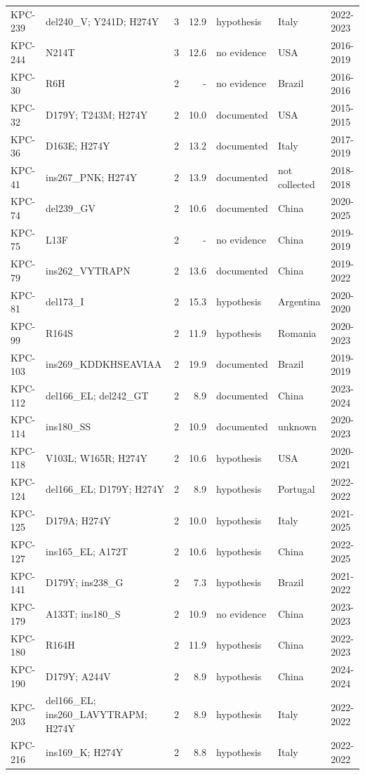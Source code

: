 \begin{longtable}{@{}l p{4.6cm} r r l l l@{}}
KPC-239 & del240\_V; Y241D; H274Y & 3 & 12.9 & hypothesis & Italy & 2022-2023 \\
KPC-244 & N214T & 3 & 12.6 & no evidence & USA & 2016-2019 \\
KPC-30 & R6H & 2 & - & no evidence & Brazil & 2016-2016 \\
KPC-32 & D179Y; T243M; H274Y & 2 & 10.0 & documented & USA & 2015-2015 \\
KPC-36 & D163E; H274Y & 2 & 13.2 & documented & Italy & 2017-2019 \\
KPC-41 & ins267\_PNK; H274Y & 2 & 13.9 & documented & not collected & 2018-2018 \\
KPC-74 & del239\_GV & 2 & 10.6 & documented & China & 2020-2025 \\
KPC-75 & L13F & 2 & - & no evidence & China & 2019-2019 \\
KPC-79 & ins262\_VYTRAPN & 2 & 13.6 & documented & China & 2019-2022 \\
KPC-81 & del173\_I & 2 & 15.3 & hypothesis & Argentina & 2020-2020 \\
KPC-99 & R164S & 2 & 11.9 & hypothesis & Romania & 2020-2023 \\
KPC-103 & ins269\_KDDKHSEAVIAA & 2 & 19.9 & documented & Brazil & 2019-2019 \\
KPC-112 & del166\_EL; del242\_GT & 2 & 8.9 & documented & China & 2023-2024 \\
KPC-114 & ins180\_SS & 2 & 10.9 & documented & unknown & 2020-2023 \\
KPC-118 & V103L; W165R; H274Y & 2 & 10.6 & hypothesis & USA & 2020-2021 \\
KPC-124 & del166\_EL; D179Y; H274Y & 2 & 8.9 & hypothesis & Portugal & 2022-2022 \\
KPC-125 & D179A; H274Y & 2 & 10.0 & hypothesis & Italy & 2021-2025 \\
KPC-127 & ins165\_EL; A172T & 2 & 10.6 & hypothesis & China & 2022-2025 \\
KPC-141 & D179Y; ins238\_G & 2 & 7.3 & hypothesis & Brazil & 2021-2022 \\
KPC-179 & A133T; ins180\_S & 2 & 10.9 & no evidence & China & 2023-2023 \\
KPC-180 & R164H & 2 & 11.9 & hypothesis & China & 2022-2023 \\
KPC-190 & D179Y; A244V & 2 & 8.9 & hypothesis & China & 2024-2024 \\
KPC-203 & del166\_EL; ins260\_LAVYTRAPM; H274Y & 2 & 8.9 & hypothesis & Italy & 2022-2022 \\
KPC-216 & ins169\_K; H274Y & 2 & 8.8 & hypothesis & Italy & 2022-2022 \\

\end{longtable}
